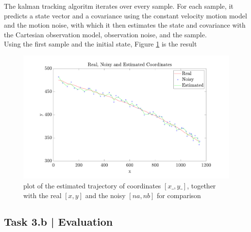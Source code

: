 \documentclass[conference]{IEEEtran}
\begin{document}
        The kalman tracking algoritm iterates over every sample. For each sample, it predicts a state vector and a covariance using the constant 
        velocity motion model and the motion noise, with which it then estimates the state and covariance with the Cartesian observation model,
        observation noise, and the sample.\\
        Using the first sample and the initial state, Figure \ref{fig:kalman} is the result
        \begin{figure}[htbp]
            \centering
            \includegraphics[width=\columnwidth]{figures/kalman.pdf}
            \caption{plot of the estimated trajectory of coordinates $[x\_, y\_]$, together with the real $[x,y]$ and the noisy $[na, nb]$ for comparison\label{fig:kalman}}
        \end{figure}

        \subsection*{Task 3.b | Evaluation}
\end{document}
